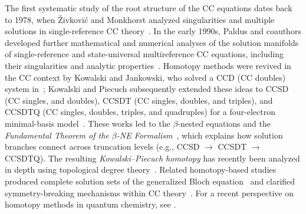 \documentclass[11pt,reqno]{amsart}
\theoremstyle{definition}
\numberwithin{theorem}{section}
\numberwithin{equation}{section}
\begin{document}
The first systematic study of the root structure of the CC equations dates back to 1978, when \v{Z}ivkovi\'c and Monkhorst analyzed singularities and multiple solutions in single-reference CC theory~\cite{vzivkovic1978analytic}. In the early 1990s, Paldus and coauthors developed further mathematical and numerical analyses of the solution manifolds of single-reference and state-universal multireference CC equations, including their singularities and analytic properties~\cite{paldus1993application,piecuch1990coupled}. Homotopy methods were revived in the CC context by Kowalski and Jankowski, who solved a CCD (CC doubles) system in~\cite{kowalski1998towards}; Kowalski and Piecuch subsequently extended these ideas to CCSD (CC singles, and doubles), CCSDT (CC singles, doubles, and triples), and CCSDTQ (CC singles, doubles, triples, and quadruples) for a four-electron minimal-basis model~\cite{piecuch2000search}. These works led to the $\beta$-nested equations and the \emph{Fundamental Theorem of the $\beta$-NE Formalism}~\cite{kowalski2000complete2}, which explains how solution branches connect across truncation levels (e.g., CCSD $\to$ CCSDT $\to$ CCSDTQ). The resulting \emph{Kowalski--Piecuch homotopy} has recently been analyzed in depth using topological degree theory~\cite{csirik2023disc,csirik2023coupled}. Related homotopy-based studies produced complete solution sets of the generalized Bloch equation~\cite{kowalski2000complete} and clarified symmetry-breaking mechanisms within CC theory~\cite{kowalski1998full,jankowski1999physical1,jankowski1999physical2,jankowski1999physical3,jankowski1999physical4}. For a recent perspective on homotopy methods in quantum chemistry, see \cite{faulstich2023homotopy}.
\end{document}
